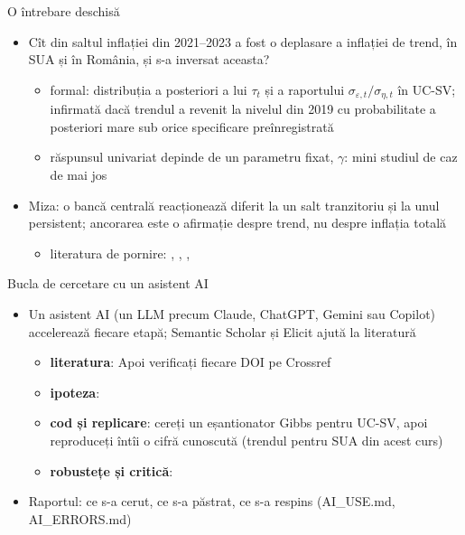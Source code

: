 \begin{frame}{O întrebare deschisă}
\itemsize{\small}
\begin{itemize}
    \item Cît din saltul inflației din 2021--2023 a fost o deplasare a inflației de trend, în SUA și în România, și s-a inversat aceasta?
    \begin{itemize}
        \item formal: distribuția a posteriori a lui $\tau_t$ și a raportului $\sigma_{\varepsilon,t}/\sigma_{\eta,t}$ în UC-SV; infirmată dacă trendul a revenit la nivelul din 2019 cu probabilitate a posteriori mare sub orice specificare preînregistrată
        \item răspunsul univariat depinde de un parametru fixat, $\gamma$: mini studiul de caz de mai jos
    \end{itemize}
    \item Miza: o bancă centrală reacționează diferit la un salt tranzitoriu și la unul persistent; ancorarea este o afirmație despre trend, nu despre inflația totală
    \begin{itemize}
        \item literatura de pornire: , , , 
    \end{itemize}
\end{itemize}
\end{frame}

\begin{frame}{Bucla de cercetare cu un asistent AI}
\itemsize{\footnotesize}
\begin{itemize}
    \item Un asistent AI (un LLM precum Claude, ChatGPT, Gemini sau Copilot) accelerează fiecare etapă; Semantic Scholar și Elicit ajută la literatură
    \begin{itemize}
        \item \textbf{literatura}:  Apoi verificați fiecare DOI pe Crossref
        \item \textbf{ipoteza}: 
        \item \textbf{cod și replicare}: cereți un eșantionator Gibbs pentru UC-SV, apoi reproduceți întîi o cifră cunoscută (trendul pentru SUA din acest curs)
        \item \textbf{robustețe și critică}: 
    \end{itemize}
    \item Raportul: ce s-a cerut, ce s-a păstrat, ce s-a respins (AI\_USE.md, AI\_ERRORS.md)
\end{itemize}
\end{frame}

